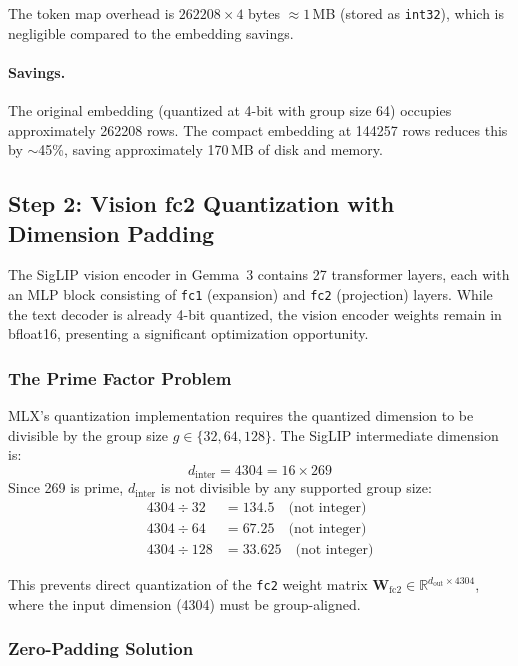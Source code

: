 \documentclass[11pt]{article}
\newcommand{\RR}{\mathbb{R}}
\begin{document}
The token map overhead is $262208 \times 4$ bytes $\approx 1$\,MB (stored as \texttt{int32}), which is negligible compared to the embedding savings.

\paragraph{Savings.} The original embedding (quantized at 4-bit with group size 64) occupies approximately 262208 rows. The compact embedding at 144257 rows reduces this by $\sim$45\%, saving approximately 170\,MB of disk and memory.

\subsection{Step 2: Vision fc2 Quantization with Dimension Padding}
\label{sec:fc2quant}

The SigLIP vision encoder in Gemma~3 contains 27 transformer layers, each with an MLP block consisting of \texttt{fc1} (expansion) and \texttt{fc2} (projection) layers. While the text decoder is already 4-bit quantized, the vision encoder weights remain in bfloat16, presenting a significant optimization opportunity.

\subsubsection{The Prime Factor Problem}

MLX's quantization implementation requires the quantized dimension to be divisible by the group size $g \in \{32, 64, 128\}$. The SigLIP intermediate dimension is:
\begin{equation}
    d_{\text{inter}} = 4304 = 16 \times 269
\end{equation}
Since 269 is prime, $d_{\text{inter}}$ is not divisible by any supported group size:
\begin{align}
    4304 \div 32 &= 134.5 \quad \text{(not integer)} \\
    4304 \div 64 &= 67.25 \quad \text{(not integer)} \\
    4304 \div 128 &= 33.625 \quad \text{(not integer)}
\end{align}

This prevents direct quantization of the \texttt{fc2} weight matrix $\mathbf{W}_{\text{fc2}} \in \RR^{d_{\text{out}} \times 4304}$, where the input dimension (4304) must be group-aligned.

\subsubsection{Zero-Padding Solution}
\end{document}
